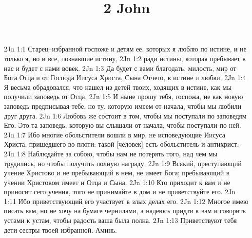 

\title{2 John}

2Jn 1:1  Старец--избранной госпоже и детям ее, которых я люблю по истине, и не только я, но и все, познавшие истину,
2Jn 1:2  ради истины, которая пребывает в нас и будет с нами вовек.
2Jn 1:3  Да будет с вами благодать, милость, мир от Бога Отца и от Господа Иисуса Христа, Сына Отчего, в истине и любви.
2Jn 1:4  Я весьма обрадовался, что нашел из детей твоих, ходящих в истине, как мы получили заповедь от Отца.
2Jn 1:5  И ныне прошу тебя, госпожа, не как новую заповедь предписывая тебе, но ту, которую имеем от начала, чтобы мы любили друг друга.
2Jn 1:6  Любовь же состоит в том, чтобы мы поступали по заповедям Его. Это та заповедь, которую вы слышали от начала, чтобы поступали по ней.
2Jn 1:7  Ибо многие обольстители вошли в мир, не исповедующие Иисуса Христа, пришедшего во плоти: такой [человек] есть обольститель и антихрист.
2Jn 1:8  Наблюдайте за собою, чтобы нам не потерять того, над чем мы трудились, но чтобы получить полную награду.
2Jn 1:9  Всякий, преступающий учение Христово и не пребывающий в нем, не имеет Бога; пребывающий в учении Христовом имеет и Отца и Сына.
2Jn 1:10  Кто приходит к вам и не приносит сего учения, того не принимайте в дом и не приветствуйте его.
2Jn 1:11  Ибо приветствующий его участвует в злых делах его.
2Jn 1:12  Многое имею писать вам, но не хочу на бумаге чернилами, а надеюсь придти к вам и говорить устами к устам, чтобы радость ваша была полна.
2Jn 1:13  Приветствуют тебя дети сестры твоей избранной. Аминь.


